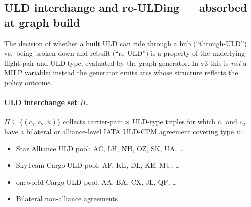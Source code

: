 \documentclass[11pt,a4paper]{article}
\theoremstyle{definition}
\begin{document}
\subsection{ULD interchange and re-ULDing --- absorbed at graph build}
\label{sec:through-uld}

The decision of whether a built ULD can ride through a hub (``through-ULD'')
vs.\ being broken down and rebuilt (``re-ULD'') is a property of the
underlying flight pair and ULD type, evaluated by the graph generator. In v3
this is \emph{not} a MILP variable; instead the generator emits arcs whose
structure reflects the policy outcome.

\paragraph{ULD interchange set $\Pi$.}
$\Pi \subseteq \{(c_1, c_2, u)\}$ collects carrier-pair $\times$ ULD-type
triples for which $c_1$ and $c_2$ have a bilateral or alliance-level IATA
ULD-CPM agreement covering type $u$:
\begin{itemize}[noitemsep]
  \item Star Alliance ULD pool: AC, LH, NH, OZ, SK, UA, \ldots
  \item SkyTeam Cargo ULD pool: AF, KL, DL, KE, MU, \ldots
  \item oneworld Cargo ULD pool: AA, BA, CX, JL, QF, \ldots
  \item Bilateral non-alliance agreements.
\end{itemize}
\end{document}
